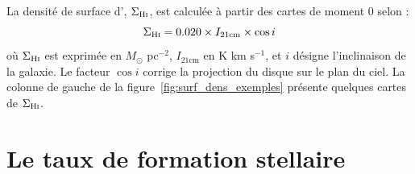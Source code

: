 La densité de surface d'\HI, $\Sigma_{\textrm{H\textsc{i}}}$, est calculée à partir des cartes de moment 0 selon \citet{Leroy2008} :
\begin{equation}
	\Sigma_{\textrm{H\textsc{i}}} = 0.020 \times I_{21\mathrm{cm}} \times \cos i
	\label{eq:mom0_HI}
\end{equation}
\noindent où $\Sigma_{\textrm{H\textsc{i}}}$ est exprimée en $M_\odot$ pc$^{-2}$, $I_{21\mathrm{cm}}$ en K km s$^{-1}$, et $i$ désigne l'inclinaison de la galaxie. Le facteur $\cos i$ corrige la projection du disque sur le plan du ciel. La colonne de gauche de la figure~\ref{fig:surf_dens_exemples} présente quelques cartes de $\Sigma_{\textrm{H\textsc{i}}}$.

\section{Le taux de formation stellaire}

